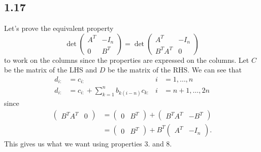 \subsection*{1.17}
\begin{solution}
  Let's prove the equivalent property
  \[
    \det\begin{pmatrix}
      A^T & -I_n\\
      0 & B^T
    \end{pmatrix} =
    \det\begin{pmatrix}
      A^T & -I_n\\
      B^TA^T & 0
    \end{pmatrix}
  \]
  to work on the columns since the properties are expressed
  on the columns.
  Let $C$ be the matrix of the LHS and
  $D$ be the matrix of the RHS.
  We can see that
  \begin{align*}
    d_{i:} &= c_{i:} & i & = 1, \ldots, n\\
    d_{i:} &= c_{i:} + \sum_{k=1}^n b_{k(i-n)} c_{k:} & i & = n+1, \ldots, 2n
  \end{align*}
  since
  \begin{align*}
    \begin{pmatrix}
      B^TA^T & 0
    \end{pmatrix}
    & =
    \begin{pmatrix}
      0 & B^T
    \end{pmatrix}
    +
    \begin{pmatrix}
      B^TA^T & -B^T
    \end{pmatrix}\\
    & =
    \begin{pmatrix}
      0 & B^T
    \end{pmatrix}
    +
    B^T
    \begin{pmatrix}
      A^T & -I_n
    \end{pmatrix}.
  \end{align*}
  This gives us what we want using properties 3. and 8.
\end{solution}

